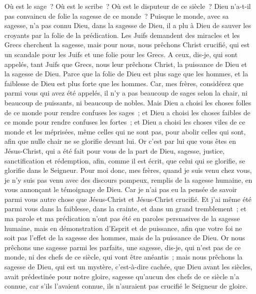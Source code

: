 \begin{multicols}{2}
Où est le sage~? Où est le scribe~? Où est le disputeur de ce siècle~? Dieu n'a-t-il pas convaincu de folie la sagesse de ce monde~?
Puisque le monde, avec sa sagesse, n'a pas connu Dieu, dans la sagesse de Dieu, il a plu à Dieu de sauver les croyants par la folie de la prédication.
Les Juifs demandent des miracles et les Grecs cherchent la sagesse,
mais pour nous, nous prêchons Christ crucifié, qui est un scandale pour les Juifs et une folie pour les Grecs.
A ceux, dis-je, qui sont appelés, tant Juifs que Grecs, nous leur prêchons Christ, la puissance de Dieu et la sagesse de Dieu.
Parce que la folie de Dieu est plus sage que les hommes, et la faiblesse de Dieu est plus forte que les hommes.
Car, mes frères, considérez que parmi vous qui avez été appelés, il n'y a pas beaucoup de sages selon la chair, ni beaucoup de puissants, ni beaucoup de nobles.
Mais Dieu a choisi les choses folles de ce monde pour rendre confuses les sages~; et Dieu a choisi les choses faibles de ce monde pour rendre confuses les fortes~;
et Dieu a choisi les choses viles de ce monde et les méprisées, même celles qui ne sont pas, pour abolir celles qui sont,
afin que nulle chair ne se glorifie devant lui.
Or c'est par lui que vous êtes en Jésus-Christ, qui a été fait pour vous de la part de Dieu, sagesse, justice, sanctification et rédemption,
afin, comme il est écrit, que celui qui se glorifie, se glorifie dans le Seigneur.
\VerseOne{}Pour moi donc, mes frères, quand je suis venu chez vous, je n'y suis pas venu avec des discours pompeux, remplis de la sagesse humaine, en vous annonçant le témoignage de Dieu.
Car je n'ai pas eu la pensée de savoir parmi vous autre chose que Jésus-Christ et Jésus-Christ crucifié.
Et j'ai même été parmi vous dans la faiblesse, dans la crainte, et dans un grand tremblement~;
et ma parole et ma prédication n'ont pas été en paroles persuasives de la sagesse humaine, mais en démonstration d'Esprit et de puissance,
afin que votre foi ne soit pas l'effet de la sagesse des hommes, mais de la puissance de Dieu.
Or nous prêchons une sagesse parmi les parfaits, une sagesse, dis-je, qui n'est pas de ce monde, ni des chefs de ce siècle, qui vont être anéantis~;
mais nous prêchons la sagesse de Dieu, qui est un mystère, c'est-à-dire cachée, que Dieu avant les siècles, avait prédestinée pour notre gloire,
sagesse qu'aucun des chefs de ce siècle n'a connue, car s'ils l'avaient connue, ils n'auraient pas crucifié le Seigneur de gloire.

\end{multicols}

